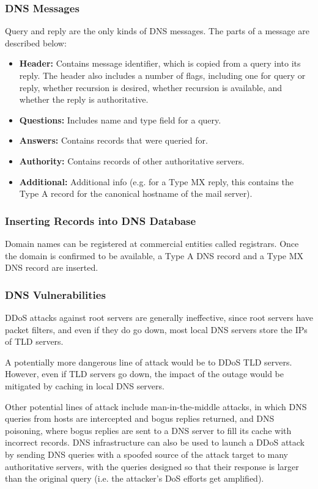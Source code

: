\documentclass[12pt,titlepage]{article}
\begin{document}
    \subsubsection{DNS Messages}
      Query and reply are the only kinds of DNS messages. The parts of a message are described below:
      \begin{itemize}
        \item \textbf{Header:} Contains message identifier, which is copied from a query into its reply. The header also includes a number of flags, including one for
        query or reply, whether recursion is desired, whether recursion is available, and whether the reply is authoritative.
        \item \textbf{Questions:} Includes name and type field for a query.
        \item \textbf{Answers:} Contains records that were queried for.
        \item \textbf{Authority:} Contains records of other authoritative servers.
        \item \textbf{Additional:} Additional info (e.g. for a Type MX reply, this contains the Type A record for the canonical hostname of the mail server).
      \end{itemize}

    \subsubsection{Inserting Records into DNS Database}
      Domain names can be registered at commercial entities called registrars. Once the domain is confirmed to be available, a Type A DNS record and a Type MX DNS
      record are inserted.

    \subsubsection{DNS Vulnerabilities}
      DDoS attacks against root servers are generally ineffective, since root servers have packet filters, and even if they do go down, most local DNS servers store the IPs of
      TLD servers.

      A potentially more dangerous line of attack would be to DDoS TLD servers. However, even if TLD servers go down, the impact of the outage would be mitigated
      by caching in local DNS servers.

      Other potential lines of attack include man-in-the-middle attacks, in which DNS queries from hosts are intercepted and bogus replies returned,
      and DNS poisoning, where bogus replies are sent to a DNS server to fill its cache with incorrect records. DNS infrastructure can also be used to launch a DDoS attack by sending
      DNS queries with a spoofed source of the attack target to many authoritative servers, with the queries designed so that their response is larger than the original query (i.e. the
      attacker's DoS efforts get amplified).
\end{document}
